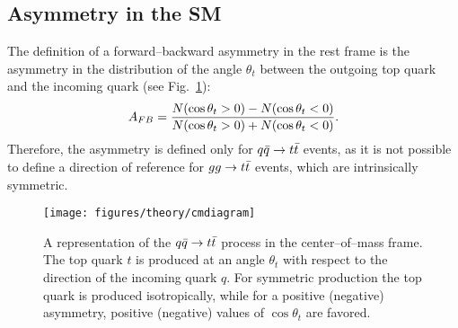 \subsection{Asymmetry in the SM}
\label{sec:smca}

The definition of a forward--backward asymmetry in the
\ttbar{} rest frame is the asymmetry in the distribution of the angle
$\theta_t$ between the outgoing top quark and the incoming quark
(see Fig.~\ref{fig:cmdiagram}):
\begin{equation}
\label{eq:afbcostheta}
A_{FB}{}=\frac{N(\cos\theta_t>0)-N(\cos\theta_t<0)}{N(\cos\theta_t>0)+N(\cos\theta_t<0)}.
\end{equation}
Therefore, the asymmetry is defined only for \mbox{$q\bar{q}{}\to t\bar{t}{}$}
events, as it is not possible to define a direction of reference for
$gg\to t\bar{t}{}$ events, which are intrinsically symmetric.
\begin{figure}[!htb]\centering
  \texttt{[image: figures/theory/cmdiagram]}
  \caption{A representation of the $q\bar{q}{}\to t\bar{t}{}$ process in the
    center--of--mass frame. The top quark $t$ is produced at an angle
    $\theta_t$ with respect to the direction of the incoming quark
    $q$. For symmetric production the top quark is produced
    isotropically, while for a positive (negative) asymmetry, positive
    (negative) values of $\cos\theta_t$ are favored.} 
  \label{fig:cmdiagram}
\end{figure}

